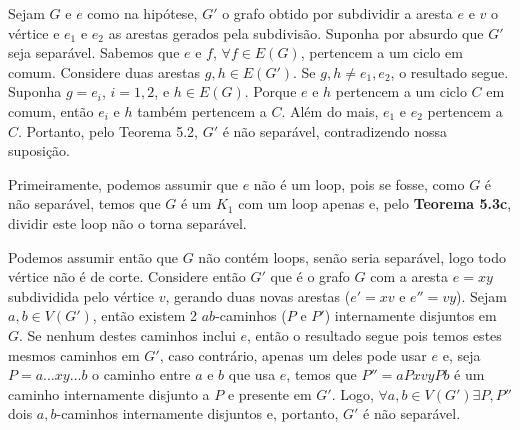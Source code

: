 
 Sejam $G$ e $e$ como na hipótese, $G'$ o grafo obtido por
subdividir a aresta $e$ e $v$ o vértice e $e_1$ e $e_2$ as arestas gerados pela
subdivisão.  Suponha por absurdo que $G'$ seja separável. Sabemos que $e$ e
$f$, $\forall f \in E(G)$, pertencem a um ciclo em comum. Considere duas
arestas $g, h \in E(G')$.  Se $g,h \ne e_1, e_2$, o resultado segue. Suponha $g
= e_i$, $i = 1, 2$, e $h \in E(G)$. Porque $e$ e $h$ pertencem a um ciclo $C$
em comum, então $e_i$ e $h$ também pertencem a $C$. Além do mais, $e_1$ e $e_2$
pertencem a $C$.  Portanto, pelo Teorema 5.2, $G'$ é não separável,
contradizendo nossa suposição.

 Primeiramente, podemos assumir que $e$ não é um loop, pois
se fosse, como $G$ é não separável, temos que $G$ é um $K_1$ com um loop apenas e,
pelo {\bf Teorema 5.3c}, dividir este loop não o torna separável.

Podemos assumir então que $G$ não contém loops, senão seria separável, logo todo
vértice não é de corte. Considere então $G'$ que é o grafo $G$ com a aresta 
$e = xy$ subdividida pelo vértice $v$, gerando duas novas arestas ($e'= xv$ e 
$e''= vy$). Sejam $a,b \in V(G')$, então existem 2 $ab$-caminhos ($P$ e $P'$)
internamente disjuntos em $G$. Se nenhum destes caminhos inclui $e$, então o 
resultado segue pois temos estes mesmos caminhos em $G'$, caso contrário, apenas
um deles pode usar $e$ e, seja $P = a\ldots xy \ldots b$ o caminho entre $a$ e
$b$ que usa $e$, temos que $P'' = aPxvyPb$ é um caminho internamente disjunto a
$P$ e presente em $G'$. Logo, $\forall a,b \in V(G') \exists P,P''$ dois 
$a,b$-caminhos internamente disjuntos e, portanto, $G'$ é não separável. 
\fimprova
